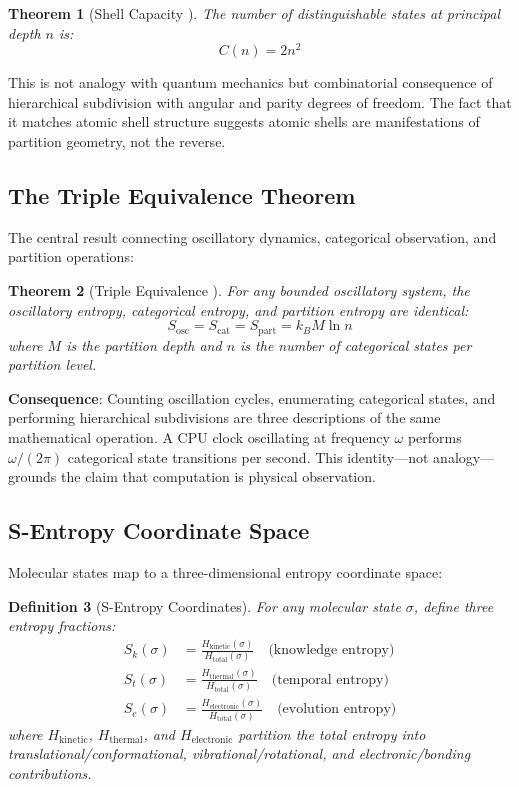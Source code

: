 \documentclass[11pt,a4paper]{article}
\newtheorem{theorem}{Theorem}[section]
\newtheorem{definition}[theorem]{Definition}
\begin{document}
\begin{theorem}[Shell Capacity \cite{Paper6}]
The number of distinguishable states at principal depth $n$ is:
\begin{equation}
C(n) = 2n^2
\end{equation}
\end{theorem}

This is not analogy with quantum mechanics but combinatorial consequence of hierarchical subdivision with angular and parity degrees of freedom. The fact that it matches atomic shell structure suggests atomic shells are manifestations of partition geometry, not the reverse.

\subsection{The Triple Equivalence Theorem}

The central result connecting oscillatory dynamics, categorical observation, and partition operations:

\begin{theorem}[Triple Equivalence \cite{Paper6}]
For any bounded oscillatory system, the oscillatory entropy, categorical entropy, and partition entropy are identical:
\begin{equation}
S_{\text{osc}} = S_{\text{cat}} = S_{\text{part}} = k_B M \ln n
\end{equation}
where $M$ is the partition depth and $n$ is the number of categorical states per partition level.
\end{theorem}

\textbf{Consequence}: Counting oscillation cycles, enumerating categorical states, and performing hierarchical subdivisions are three descriptions of the same mathematical operation. A CPU clock oscillating at frequency $\omega$ performs $\omega/(2\pi)$ categorical state transitions per second. This identity—not analogy—grounds the claim that computation is physical observation.

\subsection{S-Entropy Coordinate Space}

Molecular states map to a three-dimensional entropy coordinate space:

\begin{definition}[S-Entropy Coordinates]
For any molecular state $\sigma$, define three entropy fractions:
\begin{align}
S_k(\sigma) &= \frac{H_{\text{kinetic}}(\sigma)}{H_{\text{total}}(\sigma)} \quad \text{(knowledge entropy)}\\
S_t(\sigma) &= \frac{H_{\text{thermal}}(\sigma)}{H_{\text{total}}(\sigma)} \quad \text{(temporal entropy)}\\
S_e(\sigma) &= \frac{H_{\text{electronic}}(\sigma)}{H_{\text{total}}(\sigma)} \quad \text{(evolution entropy)}
\end{align}
where $H_{\text{kinetic}}$, $H_{\text{thermal}}$, and $H_{\text{electronic}}$ partition the total entropy into translational/conformational, vibrational/rotational, and electronic/bonding contributions.
\end{definition}
\end{document}
